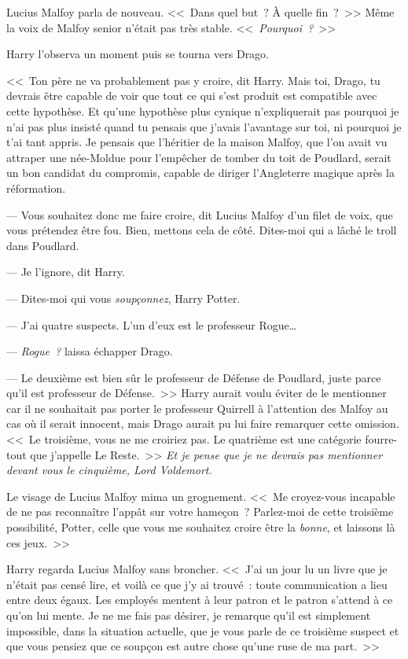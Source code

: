 Lucius Malfoy parla de nouveau. <<~Dans quel but~? À quelle fin~?~>> Même la voix de Malfoy senior n'était pas très stable. <<~\emph{Pourquoi~?}~>>

Harry l'observa un moment puis se tourna vers Drago.

<<~Ton père ne va probablement pas y croire, dit Harry. Mais toi, Drago, tu devrais être capable de voir que tout ce qui s'est produit est compatible avec cette hypothèse. Et qu'une hypothèse plus cynique n'expliquerait pas pourquoi je n'ai pas plus insisté quand tu pensais que j'avais l'avantage sur toi, ni pourquoi je t'ai tant appris. Je pensais que l'héritier de la maison Malfoy, que l'on avait vu attraper une née-Moldue pour l'empêcher de tomber du toit de Poudlard, serait un bon candidat du compromis, capable de diriger l'Angleterre magique après la réformation.

--- Vous souhaitez donc me faire croire, dit Lucius Malfoy d'un filet de voix, que vous prétendez être fou. Bien, mettons cela de côté. Dites-moi qui a lâché le troll dans Poudlard.

--- Je l'ignore, dit Harry.

--- Dites-moi qui vous \emph{soupçonnez}, Harry Potter.

--- J'ai quatre suspects. L'un d'eux est le professeur Rogue…

--- \emph{Rogue~?} laissa échapper Drago.

--- Le deuxième est bien sûr le professeur de Défense de Poudlard, juste parce qu'il est professeur de Défense.~>> Harry aurait voulu éviter de le mentionner car il ne souhaitait pas porter le professeur Quirrell à l'attention des Malfoy au cas où il serait innocent, mais Drago aurait pu lui faire remarquer cette omission. <<~Le troisième, vous ne me croiriez pas. Le quatrième est une catégorie fourre-tout que j'appelle Le Reste.~>> \emph{Et je pense que je ne devrais pas mentionner devant vous le cinquième, Lord Voldemort.}

Le visage de Lucius Malfoy mima un grognement. <<~Me croyez-vous incapable de ne pas reconnaître l'appât sur votre hameçon~? Parlez-moi de cette troisième possibilité, Potter, celle que vous me souhaitez croire être la \emph{bonne}, et laissons là ces jeux.~>>

Harry regarda Lucius Malfoy sans broncher. <<~J'ai un jour lu un livre que je n'était pas censé lire, et voilà ce que j'y ai trouvé~: toute communication a lieu entre deux égaux. Les employés mentent à leur patron et le patron s'attend à ce qu'on lui mente. Je ne me fais pas désirer, je remarque qu'il est simplement impossible, dans la situation actuelle, que je vous parle de ce troisième suspect et que vous pensiez que ce soupçon est autre chose qu'une ruse de ma part.~>>

